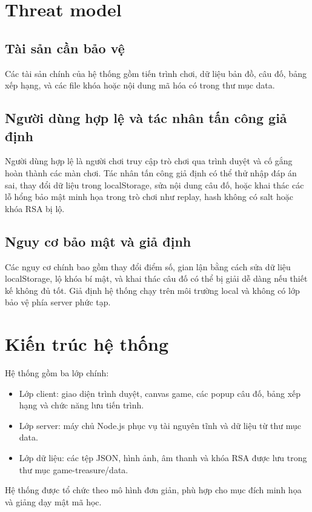 \section{Threat model}

\subsection{Tài sản cần bảo vệ}

Các tài sản chính của hệ thống gồm tiến trình chơi, dữ liệu bản đồ, câu đố, bảng xếp hạng, và các file khóa hoặc nội dung mã hóa có trong thư mục data.

\subsection{Người dùng hợp lệ và tác nhân tấn công giả định}

Người dùng hợp lệ là người chơi truy cập trò chơi qua trình duyệt và cố gắng hoàn thành các màn chơi. Tác nhân tấn công giả định có thể thử nhập đáp án sai, thay đổi dữ liệu trong localStorage, sửa nội dung câu đố, hoặc khai thác các lỗ hổng bảo mật minh họa trong trò chơi như replay, hash không có salt hoặc khóa RSA bị lộ.

\subsection{Nguy cơ bảo mật và giả định}

Các nguy cơ chính bao gồm thay đổi điểm số, gian lận bằng cách sửa dữ liệu localStorage, lộ khóa bí mật, và khai thác câu đố có thể bị giải dễ dàng nếu thiết kế không đủ tốt. Giả định hệ thống chạy trên môi trường local và không có lớp bảo vệ phía server phức tạp.

\section{Kiến trúc hệ thống}

Hệ thống gồm ba lớp chính:

\begin{itemize}
    \item Lớp client: giao diện trình duyệt, canvas game, các popup câu đố, bảng xếp hạng và chức năng lưu tiến trình.
    \item Lớp server: máy chủ Node.js phục vụ tài nguyên tĩnh và dữ liệu từ thư mục data.
    \item Lớp dữ liệu: các tệp JSON, hình ảnh, âm thanh và khóa RSA được lưu trong thư mục game-treasure/data.
\end{itemize}

Hệ thống được tổ chức theo mô hình đơn giản, phù hợp cho mục đích minh họa và giảng dạy mật mã học.
